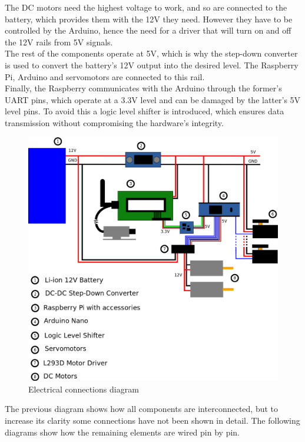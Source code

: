 The DC motors need the highest voltage to work, and so are connected to the battery, which provides them with the 12V they need. However they have to be controlled by the Arduino, hence the need for a driver that will turn on and off the 12V rails from 5V signals.\\

The rest of the components operate at 5V, which is why the step-down converter is used to convert the battery's 12V output into the desired level. The Raspberry Pi, Arduino and servomotors are connected to this rail.\\

Finally, the Raspberry communicates with the Arduino through the former's UART pins, which operate at a 3.3V level and can be damaged by the latter's 5V level pins. To avoid this a logic level shifter is introduced, which ensures data transmission without compromising the hardware's integrity.\\

	\begin{figure}[H]
			\centering
			\includegraphics[width=15cm, angle=0]{images/Diagrams/electrical.png}
			\caption{Electrical connections diagram }
			\label{electricDiagram}
	\end{figure}
	\bigskip
	
\bigskip


The previous diagram shows how all components are interconnected, but to increase its clarity some connections have not been shown in detail. The following diagrams show how the remaining elements are wired pin by pin.

